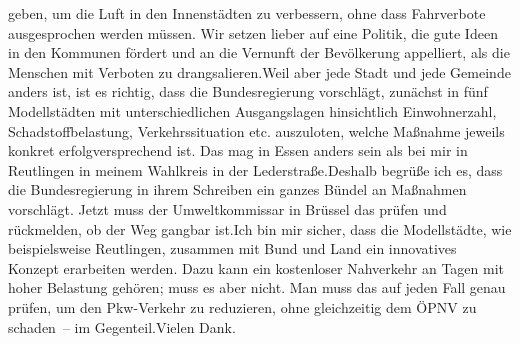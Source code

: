 \documentclass{article}
\begin{document}
geben, um die Luft in den Innenstädten zu verbessern, ohne dass Fahrverbote ausgesprochen werden müssen. Wir setzen lieber auf eine Politik, die gute Ideen in den Kommunen fördert und an die Vernunft der Bevölkerung appelliert, als die Menschen mit Verboten zu drangsalieren.Weil aber jede Stadt und jede Gemeinde anders ist, ist es richtig, dass die Bundesregierung vorschlägt, zunächst in fünf Modellstädten mit unterschiedlichen Ausgangslagen hinsichtlich Einwohnerzahl, Schadstoffbelastung, Verkehrssituation etc. auszuloten, welche Maßnahme jeweils konkret erfolgversprechend ist. Das mag in Essen anders sein als bei mir in Reutlingen in meinem Wahlkreis in der Lederstraße.Deshalb begrüße ich es, dass die Bundesregierung in ihrem Schreiben ein ganzes Bündel an Maßnahmen vorschlägt. Jetzt muss der Umweltkommissar in Brüssel das prüfen und rückmelden, ob der Weg gangbar ist.Ich bin mir sicher, dass die Modellstädte, wie beispielsweise Reutlingen, zusammen mit Bund und Land ein innovatives Konzept erarbeiten werden. Dazu kann ein kostenloser Nahverkehr an Tagen mit hoher Belastung gehören; muss es aber nicht. Man muss das auf jeden Fall genau prüfen, um den Pkw-Verkehr zu reduzieren, ohne gleichzeitig dem ÖPNV zu schaden – im Gegenteil.Vielen Dank.
\end{document}
